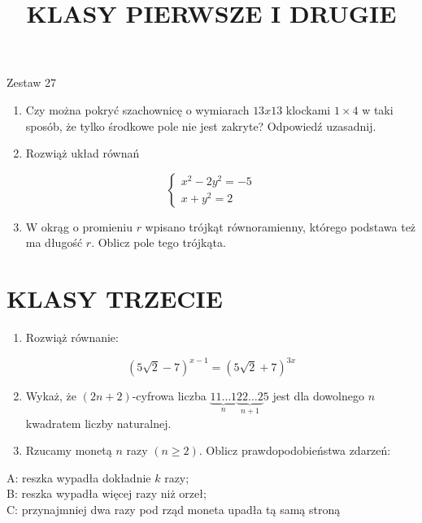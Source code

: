 \documentclass[10pt]{article}
\title{KLASY PIERWSZE I DRUGIE }
\author{}
\date{}
\begin{document}
\maketitle
Zestaw 27

\begin{enumerate}
  \item Czy można pokryć szachownicę o wymiarach \(13 x 13\) klockami \(1 \times 4\) w taki sposób, że tylko środkowe pole nie jest zakryte? Odpowiedź uzasadnij.
  \item Rozwiąż układ równań
\end{enumerate}

\[
\left\{\begin{array}{c}
x^{2}-2 y^{2}=-5 \\
x+y^{2}=2
\end{array}\right.
\]

\begin{enumerate}
  \setcounter{enumi}{2}
  \item W okrąg o promieniu \(r\) wpisano trójkąt równoramienny, którego podstawa też ma długość \(r\). Oblicz pole tego trójkąta.
\end{enumerate}

\section*{KLASY TRZECIE}
\begin{enumerate}
  \item Rozwiąż równanie:
\end{enumerate}

\[
(5 \sqrt{2}-7)^{x-1}=(5 \sqrt{2}+7)^{3 x}
\]

\begin{enumerate}
  \setcounter{enumi}{1}
  \item Wykaż, że \((2 n+2)\)-cyfrowa liczba \(\underbrace{11 \ldots 1}_{n} \underbrace{22 \ldots 2}_{n+1} 5\) jest dla dowolnego \(n\) kwadratem liczby naturalnej.
  \item Rzucamy monetą \(n\) razy \((n \geq 2)\). Oblicz prawdopodobieństwa zdarzeń:
\end{enumerate}

A: reszka wypadła dokładnie \(k\) razy;\\
B: reszka wypadła więcej razy niż orzeł;\\
C: przynajmniej dwa razy pod rząd moneta upadła tą samą stroną
\end{document}
